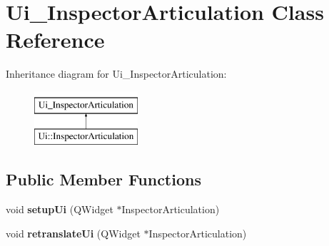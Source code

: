 \hypertarget{class_ui___inspector_articulation}{}\section{Ui\+\_\+\+Inspector\+Articulation Class Reference}
\label{class_ui___inspector_articulation}
Inheritance diagram for Ui\+\_\+\+Inspector\+Articulation\+:\begin{figure}[H]
\begin{center}
\leavevmode
\includegraphics[height=2.000000cm]{class_ui___inspector_articulation}
\end{center}
\end{figure}
\subsection*{Public Member Functions}
\begin{DoxyCompactItemize}
\item 
\mbox{\label{class_ui___inspector_articulation_a16e06636a3bcee5c8e5bbf17c155efe4}} 
void {\bfseries setup\+Ui} (Q\+Widget $\ast$Inspector\+Articulation)
\item 
\mbox{\label{class_ui___inspector_articulation_af3ed55b1626a6dce127879b326a5b6ff}} 
void {\bfseries retranslate\+Ui} (Q\+Widget $\ast$Inspector\+Articulation)
\end{DoxyCompactItemize}
